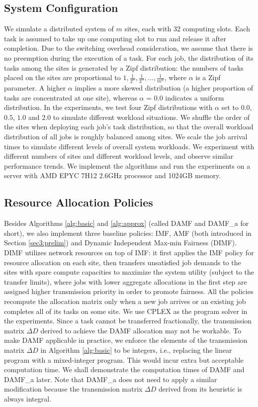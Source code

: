 \subsection{System Configuration}
We simulate a distributed system of $m$ sites, each with 32 computing slots. Each task is assumed to take up one computing slot to run and release it after completion. Due to the switching overhead consideration, we assume that there is no preemption during the execution of a task. For each job, the distribution of its tasks among the sites is generated by a Zipf distribution: the numbers of tasks placed on the sites are proportional to $1, \frac{1}{2^\alpha}, \frac{1}{3^\alpha}, ..., \frac{1}{m^\alpha}$, where $\alpha$ is a Zipf parameter. A higher $\alpha$ implies a more skewed distribution (a higher proportion of tasks are concentrated at one site), whereas $\alpha$ = $0.0$ indicates a uniform distribution. In the experiments, we test four Zipf distributions with $\alpha$ set to $0.0$, $0.5$, $1.0$ and $2.0$ to simulate different workload situations. We shuffle the order of the sites when deploying each job's task distribution, so that the overall workload distribution of all jobs is roughly balanced among sites. We scale the job arrival times to simulate different levels of overall system workloads. We experiment with different numbers of sites and different workload levels, and observe similar performance trends. We implement the algorithms and run the experiments on a server with AMD EPYC 7H12 2.6GHz processor and 1024GB memory.

\subsection{Resource Allocation Policies}
\label{resource_policy}
Besides Algorithms \ref{alg:basic} and \ref{alg:approx} (called DAMF and DAMF\_a for short), we also implement three baseline policies: IMF, AMF (both introduced in Section \ref{sec3:prelim}) and Dynamic Independent Max-min Fairness (DIMF). DIMF utilizes network resources on top of IMF: it first applies the IMF policy for resource allocation on each site, then transfers unsatisfied job demands to the sites with spare compute capacities to maximize the system utility (subject to the transfer limits), where jobs with lower aggregate allocations in the first step are assigned higher transmission priority in order to promote fairness. All the policies recompute the allocation matrix only when a new job arrives or an existing job completes all of its tasks on some site. We use CPLEX \cite{Cplex} as the program solver in the experiments. Since a task cannot be transferred fractionally, the transmission matrix $\Delta D$ derived to achieve the DAMF allocation may not be workable. To make DAMF applicable in practice, we enforce the elements of the transmission matrix $\Delta D$ in Algorithm \ref{alg:basic} to be integers, i.e., replacing the linear program with a mixed-integer program. This would incur extra but acceptable computation time. We shall demonstrate the computation times of DAMF and DAMF\_a later. Note that DAMF\_a does not need to apply a similar modification because the transmission matrix $\Delta D$ derived from its heuristic is always integral.

